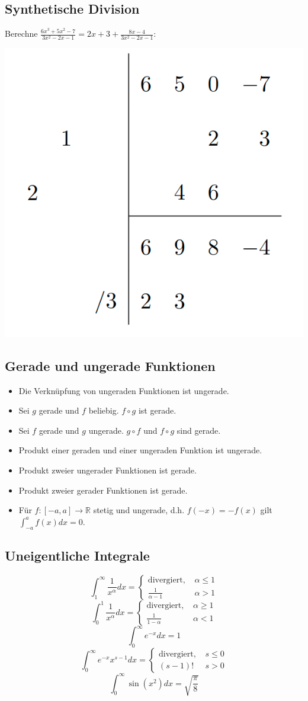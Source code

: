 \documentclass[a4paper,10pt]{article}
\begin{document}
\subsection{Synthetische Division}
Berechne $\frac{6x^3 + 5x^2 - 7}{3x^2 - 2x - 1} = 2x + 3 + \frac{8x - 4}{3x^2 -2x - 1}$:\\
\begin{center}
	\includegraphics[width=0.4 \linewidth]{synthetic-division.png}
\end{center}

\subsection{Gerade und ungerade Funktionen}
\begin{itemize}
	\item Die Verknüpfung von ungeraden Funktionen ist ungerade.
	\item Sei $g$ gerade und $f$ beliebig. $f \circ g$ ist gerade.
	\item Sei $f$ gerade und $g$ ungerade. $g \circ f$ und $f \circ g$ sind gerade.
	\item Produkt einer geraden und einer ungeraden Funktion ist ungerade.
	\item Produkt zweier ungerader Funktionen ist gerade.
	\item Produkt zweier gerader Funktionen ist gerade.
	\item Für $f: [-a, a] \to \mathbb{R}$ stetig und ungerade, d.h. $f(-x) = -f(x)$ gilt $\int_{-a}^a f(x) dx = 0$.
\end{itemize}

\subsection{Uneigentliche Integrale}
$$\int_1^\infty \frac{1}{x^\alpha} dx = \begin{cases}
		\text{divergiert, }  & \alpha \leq 1 \\
		\frac{1}{\alpha - 1} & \alpha > 1
	\end{cases}$$
$$\int_0^1 \frac{1}{x^\alpha} dx = \begin{cases}
		\text{divergiert, } & \alpha \geq 1 \\
		\frac{1}{1- \alpha} & \alpha < 1
	\end{cases}$$
$$\int_0^\infty e^{-x} dx = 1$$
$$\int_0^\infty e^{-x}x^{s-1} dx = \begin{cases}
		\text{divergiert, } & s \leq 0 \\
		(s-1)!              & s > 0
	\end{cases}$$
$$\int_0^\infty \sin(x^2) dx = \sqrt{\frac{\pi}{8}}$$
\end{document}
